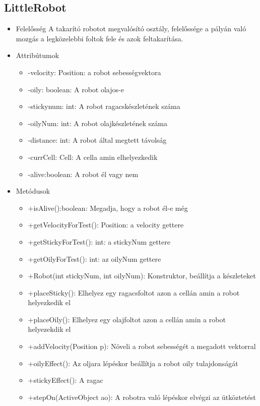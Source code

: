 \subsection{LittleRobot}
\begin{itemize}
	\item Felelősség\newline
	A takarító robotot megvalósító osztály, felelőssége a pályán való mozgás a legközelebbi foltok fele és azok feltakarítása.
	\item Attribútumok\newline
	\begin{itemize}
		\item -velocity: Position: a robot sebességvektora
		\item -oily: boolean: A robot olajos-e
		\item -stickynum: int: A robot ragacskészletének száma
		\item -oilyNum: int: A robot olajkészletének száma
		\item -distance: int: A robot által megtett távolság
		\item -currCell: Cell: A cella amin elhelyezkedik
		\item -alive:boolean: A robot él vagy nem
	\end{itemize}
	\item Metódusok\newline
	\begin{itemize}
		\item +isAlive():boolean: Megadja, hogy a robot él-e még
		\item +getVelocityForTest(): Position: a velocity gettere
		\item +getStickyForTest(): int: a stickyNum gettere
		\item +getOilyForTest(): int: az oilyNum gettere
		\item +Robot(int stickyNum, int oilyNum): Konstruktor, beállítja a készleteket
		\item +placeSticky(): Elhelyez egy ragacsfoltot azon a cellán amin a robot helyezkedik el
		\item +placeOily(): Elhelyez egy olajfoltot azon a cellán amin a robot helyezekdik el
		\item +addVelocity(Position p): Növeli a robot sebességét a megadott vektorral
		\item +oilyEffect(): Az oljara lépéskor beállítja a robot oily tulajdonságát
		\item +stickyEffect(): A ragac
		\item +stepOn(ActiveObject ao): A robotra való lépéskor elvégzi az ütköztetést

\end{itemize}
\end{itemize}
